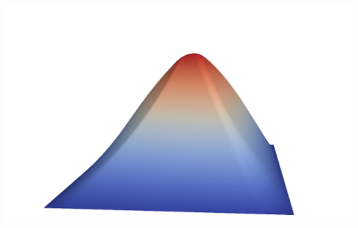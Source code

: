 \documentclass[aspectratio=169,xcolor=dvipsnames,11pt]{beamer}
\begin{document}
\begin{frame}
\begin{minipage}{0.3\linewidth}
\begin{minipage}[b]{0.5\textwidth}
  \end{minipage}%
    \includegraphics[width=0.8\linewidth]{figures/gradient_constraint_u.png}
\end{minipage}
\end{frame}
\end{document}
